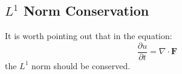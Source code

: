 \documentclass[a4paper]{article}
\theoremstyle{definition}
\begin{document}
\subsection{$L^1$ Norm Conservation}
It is worth pointing out that in the equation:
\begin{equation}
    \frac{\partial u}{\partial t} = \nabla \cdot \mathbf{F}
\end{equation}
the $L^1$ norm should be conserved.
\end{document}

